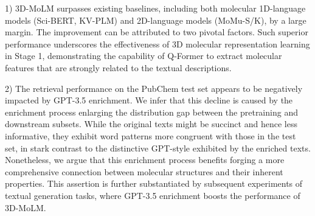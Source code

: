 1) 3D-MoLM surpasses existing baselines, including both molecular 1D-language models (\ie Sci-BERT, KV-PLM) and 2D-language models (\ie MoMu-S/K), by a large margin.
The improvement can be attributed to two pivotal factors. 
Such superior performance underscores the effectiveness of 3D molecular representation learning in Stage 1, demonstrating the capability of Q-Former to extract molecular features that are strongly related to the textual descriptions.

2) The retrieval performance on the PubChem test set appears to be negatively impacted by GPT-3.5 enrichment. 
We infer that this decline is caused by the enrichment process enlarging the distribution gap between the pretraining and downstream subsets. 
While the original texts might be succinct and hence less informative, they exhibit word patterns more congruent with those in the test set, in stark contrast to the distinctive GPT-style exhibited by the enriched texts.
Nonetheless, we argue that this enrichment process benefits forging a more comprehensive connection between molecular structures and their inherent properties.
This assertion is further substantiated by subsequent experiments of textual generation tasks, where GPT-3.5 enrichment boosts the performance of 3D-MoLM.

